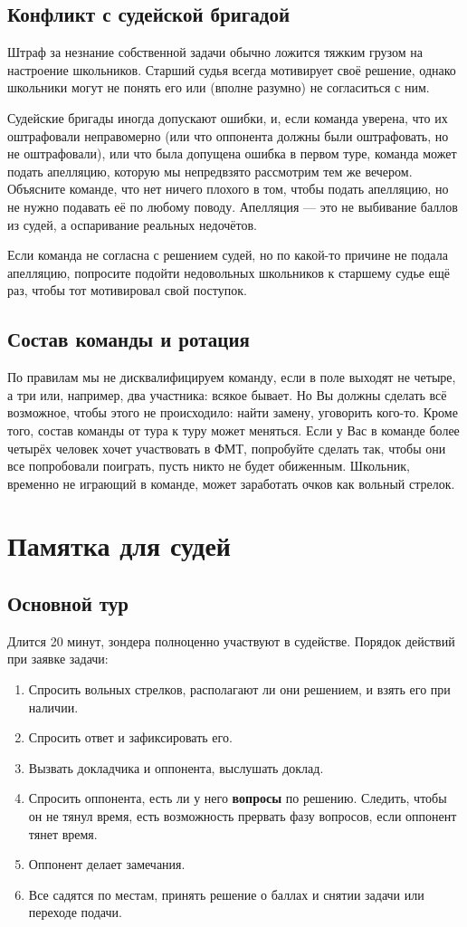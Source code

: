 \documentclass[12pt]{article}
\begin{document}
\subsection*{Конфликт с судейской бригадой}
Штраф за незнание собственной задачи обычно ложится тяжким грузом на настроение школьников. Старший судья всегда мотивирует своё решение, однако школьники могут не понять его или (вполне разумно) не согласиться с ним. 

Судейские бригады иногда допускают ошибки, и, если команда уверена, что их оштрафовали неправомерно (или что оппонента должны были оштрафовать, но не оштрафовали), или что была допущена ошибка в первом туре, команда может подать апелляцию, которую мы непредвзято рассмотрим тем же вечером. Объясните команде, что нет ничего плохого в том, чтобы подать апелляцию, но не нужно подавать её по любому поводу. Апелляция --- это не выбивание баллов из судей, а оспаривание реальных недочётов. 

Если команда не согласна с решением судей, но по какой-то причине не подала апелляцию, попросите подойти недовольных школьников к старшему судье ещё раз, чтобы тот мотивировал свой поступок.

\subsection*{Состав команды и ротация}
По правилам мы не дисквалифицируем команду, если в поле выходят не четыре, а три или, например, два участника: всякое бывает. Но Вы должны сделать всё возможное, чтобы этого не происходило: найти замену, уговорить кого-то. Кроме того, состав команды от тура к туру может меняться. Если у Вас в команде более четырёх человек хочет участвовать в ФМТ, попробуйте сделать так, чтобы они все попробовали поиграть, пусть никто не будет обиженным. Школьник, временно не играющий в команде, может заработать очков как вольный стрелок.

\newpage
\section*{Памятка для судей}
\subsection*{Основной тур}
Длится 20 минут, зондера полноценно участвуют в судействе.
Порядок действий при заявке задачи:
\begin{enumerate}
	\item Спросить вольных стрелков, располагают ли они решением, и взять его при наличии.
	\item Спросить ответ и зафиксировать его.
	\item Вызвать докладчика и оппонента, выслушать доклад.
	\item Спросить оппонента, есть ли у него {\bf вопросы} по решению. Следить, чтобы он не тянул время, есть возможность прервать фазу вопросов, если оппонент тянет время.
	\item Оппонент делает замечания.
	\item Все садятся по местам, принять решение о баллах и снятии задачи или переходе подачи.
\end{enumerate}
\end{document}
